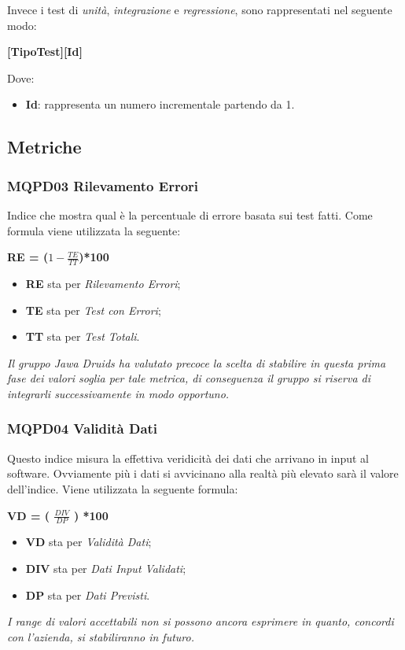 Invece i test di \textit{unità}, \textit{integrazione} e \textit{regressione}, sono rappresentati nel seguente modo:
\begin{center}
	\textbf{[TipoTest][Id]}
\end{center}
Dove:
\begin{itemize}
	\item \textbf{Id}: rappresenta un numero incrementale partendo da 1.
\end{itemize}


\subsection{Metriche}\label{ProcessiDiSupportoVerificaMetriche}
\subsubsection{MQPD03 Rilevamento Errori}\label{ProcessiDiSupportoVerificaMetricheMQPD03RilevamentoErrori}
Indice che mostra qual è la percentuale di errore basata sui test fatti.
Come formula viene utilizzata la seguente:
\begin{center}
	\textbf{RE = ($1-\frac{TE}{TT}$)*100}
\end{center}
\begin{itemize}
	\item \textbf{RE} sta per \textit{Rilevamento Errori};
	\item \textbf{TE} sta per \textit{Test con Errori};
	\item \textbf{TT} sta per \textit{Test Totali}.
\end{itemize}
\textit{Il gruppo \textit{Jawa Druids} ha valutato precoce la scelta di stabilire in questa prima fase dei valori soglia per tale metrica, di conseguenza il gruppo si riserva di integrarli successivamente in modo opportuno.}

\subsubsection{MQPD04 Validità Dati}\label{ProcessiDiSupportoVerificaMetricheMQQPD04ValiditàDati}
Questo indice misura la effettiva veridicità dei dati che arrivano in input al software. Ovviamente più i dati si avvicinano alla realtà più elevato sarà il valore dell'indice.
Viene utilizzata la seguente formula:
\begin{center}
	\textbf{VD = ( $\frac{DIV}{DP}$ ) *100}
\end{center}
\begin{itemize}
	\item \textbf{VD} sta per \textit{Validità Dati};
	\item \textbf{DIV} sta per \textit{Dati Input Validati};
	\item \textbf{DP} sta per \textit{Dati Previsti}.
\end{itemize}
\textit{I range di valori accettabili non si possono ancora esprimere in quanto, concordi con l'azienda, si stabiliranno in futuro.}

